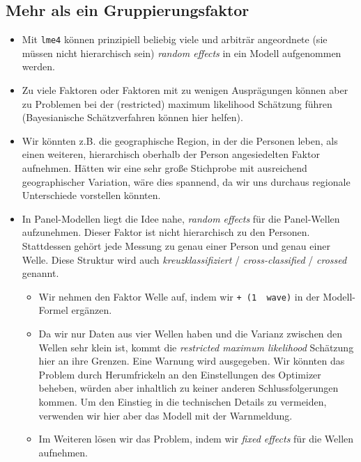 \documentclass[
]{book}
\providecommand{\tightlist}{%
  \setlength{\itemsep}{0pt}\setlength{\parskip}{0pt}}
\begin{document}
\hypertarget{mehr-als-ein-gruppierungsfaktor}{%
\subsection*{Mehr als ein Gruppierungsfaktor}\label{mehr-als-ein-gruppierungsfaktor}}

\begin{itemize}
\tightlist
\item
  Mit \texttt{lme4} können prinzipiell beliebig viele und arbiträr angeordnete (sie müssen nicht hierarchisch sein) \emph{random effects} in ein Modell aufgenommen werden.
\item
  Zu viele Faktoren oder Faktoren mit zu wenigen Ausprägungen können aber zu Problemen bei der (restricted) maximum likelihood Schätzung führen (Bayesianische Schätzverfahren können hier helfen).
\item
  Wir könnten z.B. die geographische Region, in der die Personen leben, als einen weiteren, hierarchisch oberhalb der Person angesiedelten Faktor aufnehmen. Hätten wir eine sehr große Stichprobe mit ausreichend geographischer Variation, wäre dies spannend, da wir uns durchaus regionale Unterschiede vorstellen könnten.
\item
  In Panel-Modellen liegt die Idee nahe, \emph{random effects} für die Panel-Wellen aufzunehmen. Dieser Faktor ist nicht hierarchisch zu den Personen. Stattdessen gehört jede Messung zu genau einer Person und genau einer Welle. Diese Struktur wird auch \emph{kreuzklassifiziert} / \emph{cross-classified} / \emph{crossed} genannt.

  \begin{itemize}
  \tightlist
  \item
    Wir nehmen den Faktor Welle auf, indem wir \texttt{+\ (1\ \textbar{}\ wave)} in der Modell-Formel ergänzen.
  \item
    Da wir nur Daten aus vier Wellen haben und die Varianz zwischen den Wellen sehr klein ist, kommt die \emph{restricted maximum likelihood} Schätzung hier an ihre Grenzen. Eine Warnung wird ausgegeben. Wir könnten das Problem durch Herumfrickeln an den Einstellungen des Optimizer beheben, würden aber inhaltlich zu keiner anderen Schlussfolgerungen kommen. Um den Einstieg in die technischen Details zu vermeiden, verwenden wir hier aber das Modell mit der Warnmeldung.
  \item
    Im Weiteren lösen wir das Problem, indem wir \emph{fixed effects} für die Wellen aufnehmen.
  \end{itemize}
\end{itemize}
\end{document}

